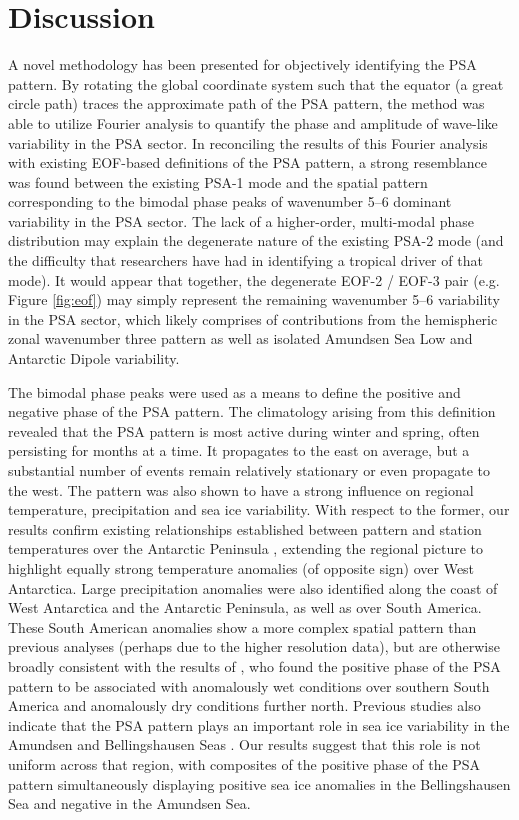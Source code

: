 \section{Discussion}

A novel methodology has been presented for objectively identifying the PSA pattern. By rotating the global coordinate system such that the equator (a great circle path) traces the approximate path of the PSA pattern, the method was able to utilize Fourier analysis to quantify the phase and amplitude of wave-like variability in the PSA sector. In reconciling the results of this Fourier analysis with existing EOF-based definitions of the PSA pattern, a strong resemblance was found between the existing PSA-1 mode and the spatial pattern corresponding to the bimodal phase peaks of wavenumber 5--6 dominant variability in the PSA sector. The lack of a higher-order, multi-modal phase distribution may explain the degenerate nature of the existing PSA-2 mode (and the difficulty that researchers have had in identifying a tropical driver of that mode). It would appear that together, the degenerate EOF-2 / EOF-3 pair (e.g. Figure \ref{fig:eof}) may simply represent the remaining wavenumber 5--6 variability in the PSA sector, which likely comprises of contributions from the hemispheric zonal wavenumber three pattern as well as isolated Amundsen Sea Low and Antarctic Dipole variability.    

The bimodal phase peaks were used as a means to define the positive and negative phase of the PSA pattern. The climatology arising from this definition revealed that the PSA pattern is most active during winter and spring, often persisting for months at a time. It propagates to the east on average, but a substantial number of events remain relatively stationary or even propagate to the west. The pattern was also shown to have a strong influence on regional temperature, precipitation and sea ice variability. With respect to the former, our results confirm existing relationships established between pattern and station temperatures over the Antarctic Peninsula \citep[e.g.][]{Schneider2012,Yu2012}, extending the regional picture to highlight equally strong temperature anomalies (of opposite sign) over West Antarctica. Large precipitation anomalies were also identified along the coast of West Antarctica and the Antarctic Peninsula, as well as over South America. These South American anomalies show a more complex spatial pattern than previous analyses (perhaps due to the higher resolution data), but are otherwise broadly consistent with the results of \citet{Mo2001}, who found the positive phase of the PSA pattern to be associated with anomalously wet conditions over southern South America and anomalously dry conditions further north. Previous studies also indicate that the PSA pattern plays an important role in sea ice variability in the Amundsen and Bellingshausen Seas \citep{Raphael2014}. Our results suggest that this role is not uniform across that region, with composites of the positive phase of the PSA pattern simultaneously displaying positive sea ice anomalies in the Bellingshausen Sea and negative in the Amundsen Sea.  

